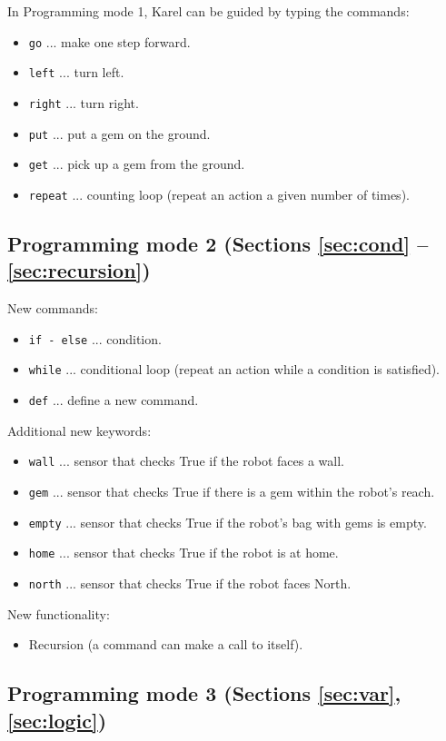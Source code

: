 In Programming mode 1, Karel can be guided by typing the commands:
\begin{itemize}
\item {\tt go} ... make one step forward.
\item {\tt left} ... turn left.
\item {\tt right} ... turn right.
\item {\tt put} ... put a gem on the ground.
\item {\tt get} ... pick up a gem from the ground.
\item {\tt repeat} ... counting loop (repeat an action a given number of times).
\end{itemize}

\subsection[\ \ Programming mode 2 (Sections \ref{sec:cond} -- \ref{sec:recursion})]{Programming mode 2 (Sections \ref{sec:cond} -- \ref{sec:recursion})}

New commands:
\begin{itemize}
\item {\tt if - else} ... condition.
\item {\tt while} ... conditional loop (repeat an action while a condition is satisfied).
\item {\tt def} ... define a new command.
\end{itemize}
Additional new keywords:
\begin{itemize}
\item {\tt wall} ... sensor that checks True if the robot faces a wall.
\item {\tt gem} ... sensor that checks True if there is a gem within the robot's reach.
\item {\tt empty} ... sensor that checks True if the robot's bag with gems is empty.
\item {\tt home} ... sensor that checks True if the robot is at home.
\item {\tt north} ... sensor that checks True if the robot faces North.
\end{itemize}
New functionality:
\begin{itemize}
\item Recursion (a command can make a call to itself).
\end{itemize}

\subsection[\ \ Programming mode 3 (Sections \ref{sec:var}, \ref{sec:logic})]{Programming mode 3 (Sections \ref{sec:var}, \ref{sec:logic})}

